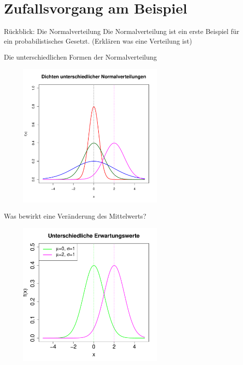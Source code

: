 \documentclass[usenames,dvipsnames,handout]{beamer}
\begin{document}
\section{Zufallsvorgang am Beispiel}

\begin{frame}{Rückblick: Die Normalverteilung}
Die Normalverteilung ist ein erste Beispiel für ein probabilistisches Gesetzt. (Erklären was eine Verteilung ist)
\end{frame}


\begin{frame}{Die unterschiedlichen Formen der Normalverteilung}
        \begin{figure}[ht]
 	\centering
 	      \includegraphics[width=0.65\textwidth]{diffnorm2_leer.pdf}
 	\end{figure}
\end{frame}

\begin{frame}{Was bewirkt eine Veränderung des Mittelwerts?}
        \begin{figure}[ht]
 	\centering
 	      \includegraphics[width=0.65\textwidth]{diffnorm2.pdf}
 	\end{figure}
\end{frame}
\end{document}
